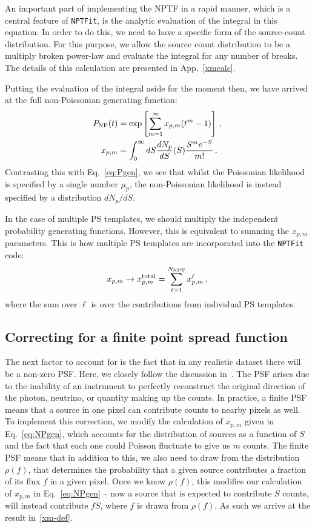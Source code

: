 An important part of implementing the NPTF in a rapid manner, which is a central feature of \texttt{NPTFit}, is the analytic evaluation of the integral in this equation. In order to do this, we need to have a specific form of the source-count distribution. For this purpose, we allow the source count distribution to be a multiply broken power-law and evaluate the integral for any number of breaks. The details of this calculation are presented in App.~\ref{xmcalc}. 

Putting the evaluation of the integral aside for the moment then, we have arrived at the full non-Poissonian generating function:
\begin{equation}\begin{aligned}
P_{\rm NP}(t) &= \exp \left[ \sum_{m=1}^{\infty} x_{p,m} (t^m - 1) \right]\,, \\
x_{p,m} &= \int_0^{\infty} dS \frac{dN_p}{dS}(S) \frac{S^m e^{-S}}{m!}\,.
\label{eq:NPgen}
\end{aligned}\end{equation}
Contrasting this with Eq.~\eqref{eq:Pgen}, we see that whilst the Poissonian likelihood is specified by a single number $\mu_p$, the non-Poissonian likelihood is instead specified by a distribution $dN_p/dS$.

In the case of multiple PS templates, we should multiply the independent probability generating functions.  However, this is equivalent to summing the $x_{p,m}$ parameters.  This is how multiple PS templates are incorporated into the \texttt{NPTFit} code:
\begin{equation}
x_{p,m} \to x_{p,m}^{\rm total} = \sum_{\ell=1}^{N_{\rm NPT}} x_{p,m}^{\ell}\,,
\end{equation}
where the sum over $\ell$ is over the contributions from individual PS templates. 

\subsection{Correcting for a finite point spread function}

The next factor to account for is the fact that in any realistic dataset there will be a non-zero PSF.  Here, we closely follow the discussion in~\cite{Malyshev:2011zi}. The PSF arises due to the inability of an instrument to perfectly reconstruct the original direction of the photon, neutrino, or quantity making up the counts. In practice, a finite PSF means that a source in one pixel can contribute counts to nearby pixels as well. To implement this correction, we modify the calculation of $x_{p,m}$ given in Eq.~\eqref{eq:NPgen}, which accounts for the distribution of sources as a function of $S$ and the fact that each one could Poisson fluctuate to give us $m$ counts. The finite PSF means that in addition to this, we also need to draw from the distribution $\rho(f)$, that determines the probability that a given source contributes a fraction of its flux $f$ in a given pixel. Once we know $\rho(f)$, this modifies our calculation of $x_{p,m}$ in Eq.~\eqref{eq:NPgen} -- now a source that is expected to contribute $S$ counts, will instead contribute $f S$, where $f$ is drawn from $\rho(f)$. As such we arrive at the result in~\eqref{xm-def}.

